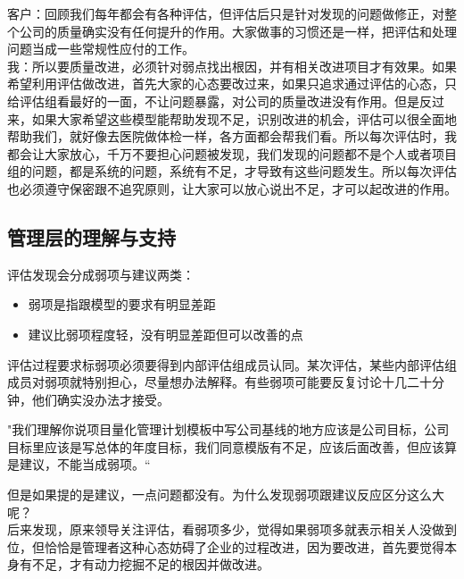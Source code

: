 
客户：回顾我们每年都会有各种评估，但评估后只是针对发现的问题做修正，对整个公司的质量确实没有任何提升的作用。大家做事的习惯还是一样，把评估和处理问题当成一些常规性应付的工作。\\

我：所以要质量改进，必须针对弱点找出根因，并有相关改进项目才有效果。如果希望利用评估做改进，首先大家的心态要改过来，如果只追求通过评估的心态，只给评估组看最好的一面，不让问题暴露，对公司的质量改进没有作用。但是反过来，如果大家希望这些模型能帮助发现不足，识别改进的机会，评估可以很全面地帮助我们，就好像去医院做体检一样，各方面都会帮我们看。所以每次评估时，我都会让大家放心，千万不要担心问题被发现，我们发现的问题都不是个人或者项目组的问题，都是系统的问题，系统有不足，才导致有这些问题发生。所以每次评估也必须遵守保密跟不追究原则，让大家可以放心说出不足，才可以起改进的作用。

\hypertarget{ux7ba1ux7406ux5c42ux7684ux7406ux89e3ux4e0eux652fux6301}{%
\subsection{管理层的理解与支持}\label{ux7ba1ux7406ux5c42ux7684ux7406ux89e3ux4e0eux652fux6301}}

评估发现会分成弱项与建议两类：

\begin{itemize}
\tightlist
\item
  弱项是指跟模型的要求有明显差距
\item
  建议比弱项程度轻，没有明显差距但可以改善的点\\
\end{itemize}

评估过程要求标弱项必须要得到内部评估组成员认同。某次评估，某些内部评估组成员对弱项就特别担心，尽量想办法解释。有些弱项可能要反复讨论十几二十分钟，他们确实没办法才接受。

"我们理解你说项目量化管理计划模板中写公司基线的地方应该是公司目标，公司目标里应该是写总体的年度目标，我们同意模版有不足，应该后面改善，但应该算是建议，不能当成弱项。``

但是如果提的是建议，一点问题都没有。为什么发现弱项跟建议反应区分这么大呢？\\
后来发现，原来领导关注评估，看弱项多少，觉得如果弱项多就表示相关人没做到位，但恰恰是管理者这种心态妨碍了企业的过程改进，因为要改进，首先要觉得本身有不足，才有动力挖掘不足的根因并做改进。



